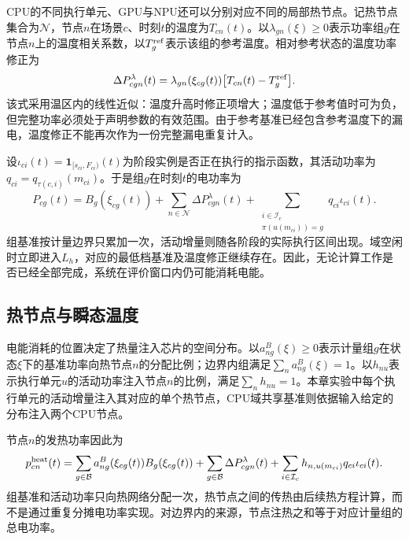 CPU的不同执行单元、GPU与NPU还可以分别对应不同的局部热节点。记热节点集合为$\mathcal N$，节点$n$在场景$c$、时刻$t$的温度为$T_{cn}(t)$。以$\lambda_{gn}(\xi)\ge0$表示功率组$g$在节点$n$上的温度相关系数，以$T_g^{\rm ref}$表示该组的参考温度。相对参考状态的温度功率修正为
\begin{equation}
 \Delta P^\lambda_{cgn}(t)=
 \lambda_{gn}(\xi_{cg}(t))
 \bigl[T_{cn}(t)-T_g^{\rm ref}\bigr].
 \label{eq:c3-leak}
\end{equation}
该式采用温区内的线性近似：温度升高时修正项增大；温度低于参考值时可为负，但完整功率必须处于声明参数的有效范围。由于参考基准已经包含参考温度下的漏电，温度修正不能再次作为一份完整漏电重复计入。

设$\iota_{ci}(t)=\mathbf1_{[s_{ci},F_{ci})}(t)$为阶段实例是否正在执行的指示函数，其活动功率为$q_{ci}=q_{\tau(c,i)}(m_{ci})$。于是组$g$在时刻$t$的电功率为
\begin{equation}
 P_{cg}(t)=B_g(\xi_{cg}(t))
 +\sum_{n\in\mathcal N}\Delta P^\lambda_{cgn}(t)
 +\sum_{\substack{i\in\mathcal I_c\\\pi(u(m_{ci}))=g}}
       q_{ci}\iota_{ci}(t).
 \label{eq:c3-group-power}
\end{equation}
组基准按计量边界只累加一次，活动增量则随各阶段的实际执行区间出现。域空闲时立即进入$L_h$，对应的最低档基准及温度修正继续存在。因此，无论计算工作是否已经全部完成，系统在评价窗口内仍可能消耗电能。

\subsection{热节点与瞬态温度}

电能消耗的位置决定了热量注入芯片的空间分布。以$a^B_{ng}(\xi)\ge0$表示计量组$g$在状态$\xi$下的基准功率向热节点$n$的分配比例；边界内组满足$\sum_n a^B_{ng}(\xi)=1$。以$h_{nu}$表示执行单元$u$的活动功率注入节点$n$的比例，满足$\sum_n h_{nu}=1$。本章实验中每个执行单元的活动增量注入其对应的单个热节点，CPU域共享基准则依据输入给定的分布注入两个CPU节点。

节点$n$的发热功率因此为
\begin{equation}
 p^{\rm heat}_{cn}(t)=
 \sum_{g\in\mathcal B}a^B_{ng}(\xi_{cg}(t))B_g(\xi_{cg}(t))
 +\sum_{g\in\mathcal B}\Delta P^\lambda_{cgn}(t)
 +\sum_{i\in\mathcal I_c}h_{n,u(m_{ci})}q_{ci}\iota_{ci}(t).
 \label{eq:c3-heat-power}
\end{equation}
组基准和活动功率只向热网络分配一次，热节点之间的传热由后续热方程计算，而不是通过重复分摊电功率实现。对边界内的来源，节点注热之和等于对应计量组的总电功率。

